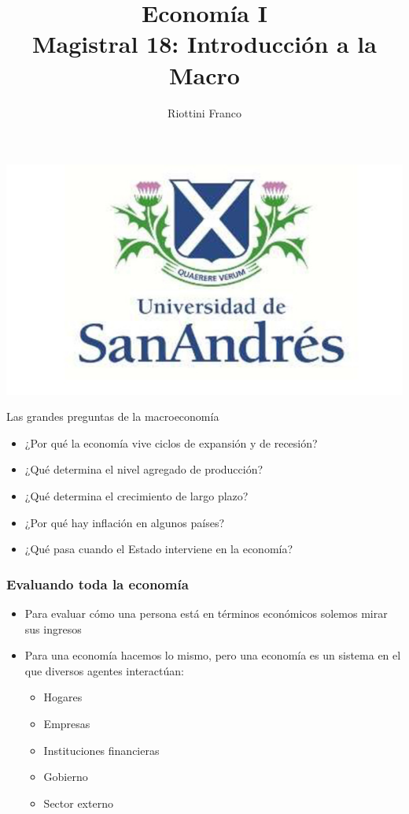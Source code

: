 \documentclass{beamer}
\title[Economía I]{Economía I \vspace{4mm}
\\ Magistral 18: Introducción a la Macro}
\date{}
\author[Franco Riottini]{Riottini Franco}
\institute[]{Universidad de San Andrés}
\begin{document}
\begin{frame}
\titlepage
\centering

\includegraphics[scale=0.2]{../Figures/logoUDESA.jpg} 
\end{frame}

\begin{frame}{Las grandes preguntas de la macroeconomía}
    \begin{itemize}
        \item ¿Por qué la economía vive ciclos de expansión y de recesión?
        \item ¿Qué determina el nivel agregado de producción?
        \item ¿Qué determina el crecimiento de largo plazo?
        \item ¿Por qué hay inflación en algunos países?
        \item ¿Qué pasa cuando el Estado interviene en la economía?
    \end{itemize} 
    
\end{frame}


\begin{frame}
\frametitle{Evaluando toda la economía}
\begin{itemize}
        \item Para evaluar cómo una persona está en términos económicos solemos mirar sus ingresos \vspace{1mm}
        \item Para una economía hacemos lo mismo, pero una economía es un sistema en el que diversos agentes interactúan: \vspace{1mm}
        \begin{itemize}
            \item Hogares
            \item Empresas
            \item Instituciones financieras
            \item Gobierno
            \item Sector externo
        \end{itemize}
\end{itemize}
\end{frame}
\end{document}
